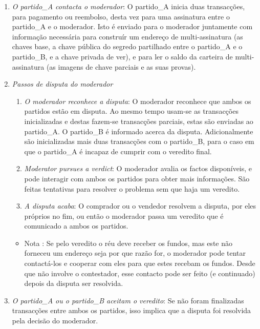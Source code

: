 \begin{enumerate}
    \begin{enumerate}
        \item {\em O partido\_A contacta o moderador}: O partido\_A inicia duas transacções, para pagamento ou reembolso, desta vez para uma assinatura entre o partido\_A e o moderador. Isto é enviado para o moderador juntamente com informação necessária para construír um endereço de multi-assinatura (as chaves base, a chave pública do segredo partilhado entre o partido\_A e o partido\_B, e a chave privada de ver), e para ler o saldo da carteira de multi-assinatura (as imagens de chave parciais e as suas provas).     
        \item {\em Passos de disputa do moderador}
        \begin{enumerate}
            \item {\em O moderador reconhece a disputa}: O moderador reconhece que ambos os partidos estão em disputa. Ao mesmo tempo usam-se as transacções inicializadas e destas fazem-se transacções parciais, estas são enviadas ao partido\_A. O partido\_B é informado acerca da disputa. Adicionalmente são inicializadas mais duas transacções com o partido\_B, para o caso em que o partido\_A é incapaz de cumprir com o veredito final.    
            \item {\em Moderator pursues a verdict}: O moderador avalia os factos disponíveis, e pode interagir com ambos os partidos para obter mais informações. São feitas tentativas para resolver o problema sem que haja um veredito.  
            \item {\em A disputa acaba}: O comprador ou o vendedor resolvem a disputa, por eles próprios no fim, ou então o moderador passa um veredito que é comunicado a ambos os partidos.
        \end{enumerate}{}
        \begin{itemize}
            \item Nota : Se pelo veredito o réu deve receber os fundos, mas este não forneceu um endereço seja por que razão for, o moderador pode tentar contactá-los e cooperar com eles para que estes recebam os fundos. Desde que não involve o contestador, esse contacto pode ser feito (e continuado) depois da disputa ser resolvida.     
        \end{itemize}{}
        \item {\em O partido\_A ou o partido\_B aceitam o veredito}: Se não foram finalizadas transacções entre ambos os partidos, isso implica que a disputa foi resolvida pela decisão do moderador. 

\end{enumerate}
\end{enumerate}
